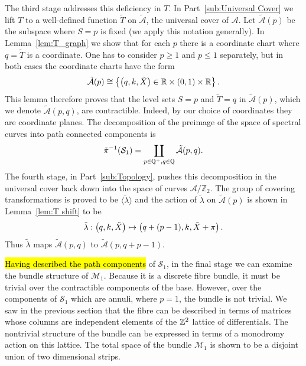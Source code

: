 \documentclass{article}
\begin{document}
The third stage addresses this deficiency in $T$. In Part~\ref{sub:Universal Cover} we lift $T$ to a well-defined function $\tilde{T}$ on $\mathcal{\tilde{A}}$, the universal cover of $\mathcal{A}$. Let $\mathcal{\tilde{A}}(p)$ be the subspace where $S=p$ is fixed (we apply this notation generally). In Lemma~\ref{lem:T_graph} we show that for each $p$ there is a coordinate chart where $q=\tilde{T}$ is a coordinate. One has to consider $p \geq 1$ and $p \leq 1$ separately, but in both cases the coordinate charts have the form 
\[
\mathcal{\tilde{A}}(p) \cong \left\{ \left(q,k,\tilde{X}\right) \in \mathbb{R} \times (0,1) \times \mathbb{R} \right\}.
\]
This lemma therefore proves that the level sets $S = p$ and $\tilde{T} = q$ in $\mathcal{\tilde{A}}(p)$, which we denote $\mathcal{\tilde{A}}(p,q)$, are contractible. Indeed, by our choice of coordinates they are coordinate planes. The decomposition of the preimage of the space of spectral curves into path connected components is
\[
\tilde{\pi}^{-1}(\mathcal{S}_1) = \coprod_{p \in \mathbb{Q}^+, q\in\mathbb{Q}} \mathcal{\tilde{A}}(p,q).
\]
The fourth stage, in Part~\ref{sub:Topology}, pushes this decomposition in the universal cover back down into the space of curves $\mathcal{A}/\mathbb{Z}_2$.
The group of covering transformations is proved to be $\langle \tilde{\lambda} \rangle$ and the action of $\tilde{\lambda}$ on $\mathcal{\tilde{A}}(p)$ is shown in Lemma~\ref{lem:T shift} to be
\[
\tilde{\lambda} : \left(q,k,\tilde{X}\right) \mapsto \left(q + (p-1),k,\tilde{X} + \pi\right).
\]
Thus $\tilde{\lambda}$ maps $\mathcal{\tilde{A}}(p,q)$ to $\mathcal{\tilde{A}}(p,q + p-1)$. 

\hl{Having described the path components} of $\mathcal{S}_1$, in the final stage we can examine the bundle structure of $\mathcal{M}_1$. Because it is a discrete fibre bundle, it must be trivial over the contractible components of the base. However, over the components of $\mathcal{S}_1$ which are annuli, where $p=1$, the bundle is not trivial. We saw in the previous section that the fibre can be described in terms of matrices whose columns are independent elements of the $\mathbb{Z}^2$ lattice of differentials. The nontrivial structure of the bundle can be expressed in terms of a monodromy action on this lattice. The total space of the bundle $\mathcal{M}_1$ is shown to be a disjoint union of two dimensional strips.
\end{document}
